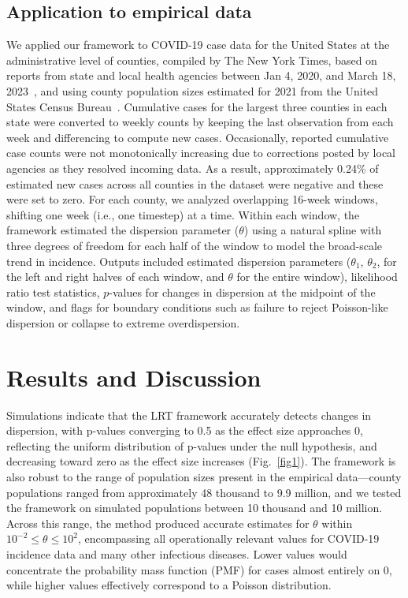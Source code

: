 \documentclass[11pt,letterpaper]{article}
\begin{document}
\subsection*{Application to empirical data}
We applied our framework to COVID-19 case data for the United States at the administrative level of counties, compiled by The New York Times, based on reports from state and local health agencies between Jan 4, 2020, and March 18, 2023~\citep{nytimes_covid19_2021}, and using county population sizes estimated for 2021 from the United States Census Bureau~\citep{us_census_county_estimates_2021}.
Cumulative cases for the largest three counties in each state were converted to weekly counts by keeping the last observation from each week and differencing to compute new cases. Occasionally, reported cumulative case counts were not monotonically increasing due to corrections posted by local agencies as they resolved incoming data. 
As a result, approximately 0.24\% of estimated new cases across all counties in the dataset were negative and these were set to zero. 
For each county, we analyzed overlapping 16-week windows, shifting one week (i.e., one timestep) at a time. 
Within each window, the framework estimated the dispersion parameter ($\theta$) using a natural spline with three degrees of freedom for each half of the window to model the broad-scale trend in incidence. 
Outputs included estimated dispersion parameters ($\theta_1$, $\theta_2$, for the left and right halves of each window, and $\theta$ for the entire window), likelihood ratio test statistics, $p$-values for changes in dispersion at the midpoint of the window, and flags for boundary conditions such as failure to reject Poisson-like dispersion or collapse to extreme overdispersion.

\section*{Results and Discussion}

Simulations indicate that the LRT framework accurately detects changes in dispersion, with p-values converging to 0.5 as the effect size approaches 0, reflecting the uniform distribution of p-values under the null hypothesis, and decreasing toward zero as the effect size increases (Fig.~\ref{fig1}). The framework is also robust to the range of population sizes present in the empirical data—county populations ranged from approximately 48 thousand to 9.9 million, and we tested the framework on simulated populations between 10 thousand and 10 million. Across this range, the method produced accurate estimates for $\theta$ within $10^{-2} \leq \theta \leq 10^2$, encompassing all operationally relevant values for COVID-19 incidence data and many other infectious diseases. Lower values would concentrate the probability mass function (PMF) for cases almost entirely on 0, while higher values effectively correspond to a Poisson distribution.
\end{document}

